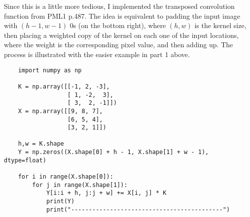 \documentclass{article}
\begin{document}
{Since this is a little more tedious, I implemented the transposed convolution function from PML1 p.487. The idea is equivalent to padding the input image with $(h-1, w-1)$ 0s (on the bottom right), where $(h, w)$ is the kernel size, then placing a weighted copy of the kernel on each one of the input locations, where the weight is the corresponding pixel value, and then adding up. The process is illustrated with the easier example in part 1 above.
\begin{verbatim}
    import numpy as np
    
    K = np.array([[-1, 2, -3], 
                  [ 1, -2,  3], 
                  [ 3,  2, -1]])
    X = np.array([[9, 8, 7], 
                  [6, 5, 4], 
                  [3, 2, 1]])
                  
    h,w = K.shape
    Y = np.zeros((X.shape[0] + h - 1, X.shape[1] + w - 1), dtype=float)
    
    for i in range(X.shape[0]):
        for j in range(X.shape[1]):
            Y[i:i + h, j:j + w] += X[i, j] * K
            print(Y)
            print("-------------------------------------------")
\end{verbatim}

}
\end{document}
